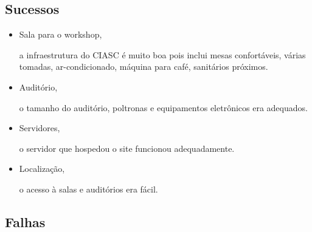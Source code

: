 \documentclass[12pt]{article}
\begin{document}
\subsection*{Sucessos}

\begin{itemize}
  \item Sala para o workshop,

    a infraestrutura do CIASC é muito boa pois inclui mesas confortáveis, várias
    tomadas, ar-condicionado, máquina para café, sanitários próximos.

  \item Auditório,

    o tamanho do auditório, poltronas e equipamentos eletrônicos era adequados.

  \item Servidores,

    o servidor que hospedou o site funcionou adequadamente.

  \item Localização,

    o acesso à salas e auditórios era fácil.
\end{itemize}

\subsection*{Falhas}
\end{document}
